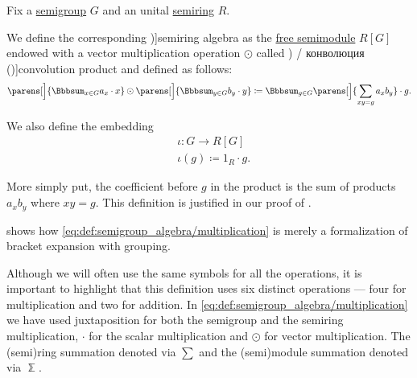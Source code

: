 \begin{definition}\label{def:semigroup_algebra}
  Fix a \hyperref[def:semigroup]{semigroup} \( G \) and an unital \hyperref[def:semiring]{semiring} \( R \).

  We define the corresponding \term[ru=групповая алгебра (\cite[504]{Винберг2014КурсАлгебры})]{semiring algebra} as the \hyperref[def:free_semimodule]{free semimodule} \( R[G] \) endowed with a vector multiplication operation \( \odot \) called \term[ru=свёртка (\cite[62]{Боровков1999ТеорияВероятностей}) / конволюция (\cite[179]{ИоффеТихомиров1974ЭкстремальныеЗадачи})]{convolution product} and defined as follows:
  \begin{equation}\label{eq:def:semigroup_algebra/multiplication}
    \parens[\Big]{ \Bbbsum_{x \in G} a_x \cdot x } \odot \parens[\Big]{ \Bbbsum_{y \in G} b_y \cdot y }
    \coloneqq
    \Bbbsum_{g \in G} \parens[\Big]{ \sum_{xy = g} a_x b_y } \cdot g.
  \end{equation}

  We also define the embedding
  \begin{equation}\label{eq:def:semigroup_algebra/embedding}
    \begin{aligned}
      &\iota: G \to R[G] \\
      &\iota(g) \coloneqq 1_R \cdot g.
    \end{aligned}
  \end{equation}
\end{definition}
\begin{comments}
  \item More simply put, the coefficient before \( g \) in the product is the sum of products \( a_x b_y \) where \( xy = g \). This definition is justified in our proof of .

  \item {} shows how \eqref{eq:def:semigroup_algebra/multiplication} is merely a formalization of bracket expansion with grouping.

  \item Although we will often use the same symbols for all the operations, it is important to highlight that this definition uses six distinct operations --- four for multiplication and two for addition. In \eqref{eq:def:semigroup_algebra/multiplication} we have used juxtaposition for both the semigroup and the semiring multiplication, \( \cdot \) for the scalar multiplication and \( \odot \) for vector multiplication. The (semi)ring summation denoted via \( \sum \) and the (semi)module summation denoted via \( \Bbbsum \).
\end{comments}

